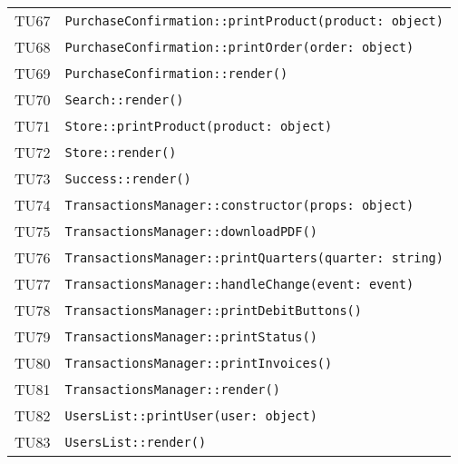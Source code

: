 \begin{longtable}{ >{\centering}p{} >{}p{}}
			\hypertarget{TU67}{TU67} & 
			\texttt{PurchaseConfirmation::printProduct(product: object)}\\

			\hypertarget{TU68}{TU68} & 
			\texttt{PurchaseConfirmation::printOrder(order: object)}\\

			\hypertarget{TU69}{TU69} & 
			\texttt{PurchaseConfirmation::render()}\\

			\hypertarget{TU70}{TU70} & 
			\texttt{Search::render()}\\

			\hypertarget{TU71}{TU71} & 
			\texttt{Store::printProduct(product: object)}\\

			\hypertarget{TU72}{TU72} & 
			\texttt{Store::render()}\\

			\hypertarget{TU73}{TU73} & 
			\texttt{Success::render()}\\

			\hypertarget{TU74}{TU74} & 
			\texttt{TransactionsManager::constructor(props: object)}\\

			\hypertarget{TU75}{TU75} & 
			\texttt{TransactionsManager::downloadPDF()}\\

			\hypertarget{TU76}{TU76} & 
			\texttt{TransactionsManager::printQuarters(quarter: string)}\\

			\hypertarget{TU77}{TU77} & 
			\texttt{TransactionsManager::handleChange(event: event)}\\

			\hypertarget{TU78}{TU78} & 
			\texttt{TransactionsManager::printDebitButtons()}\\

			\hypertarget{TU79}{TU79} & 
			\texttt{TransactionsManager::printStatus()}\\

			\hypertarget{TU80}{TU80} & 
			\texttt{TransactionsManager::printInvoices()}\\

			\hypertarget{TU81}{TU81} & 
			\texttt{TransactionsManager::render()}\\

			\hypertarget{TU82}{TU82} & 
			\texttt{UsersList::printUser(user: object)}\\

			\hypertarget{TU83}{TU83} & 
			\texttt{UsersList::render()}\\


\end{longtable}
